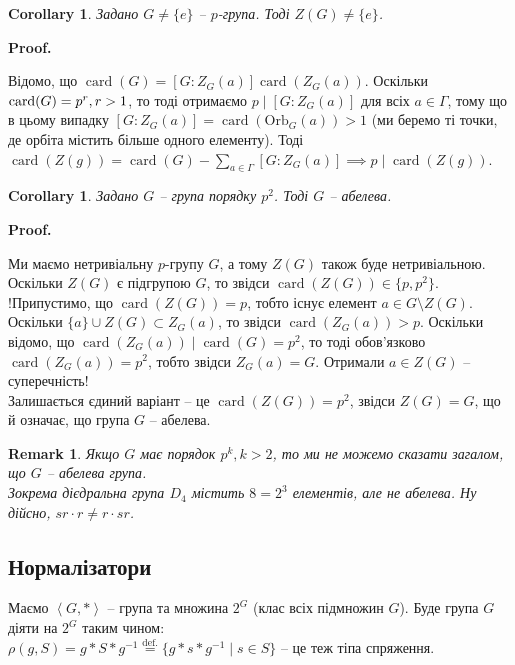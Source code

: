 \documentclass[a4paper, 10pt]{article}
\makeatletter
\theoremstyle{theoremdd}
\theoremstyle{theoremdd}
\theoremstyle{theoremdd}
\theoremstyle{theoremdd}
\theoremstyle{theoremdd}
\theoremstyle{theoremdd}
\theoremstyle{theoremdd}
\theoremstyle{theoremdd}
\theoremstyle{theoremdd}
\theoremstyle{theoremdd}
\theoremstyle{theoremdd}
\newtheorem{remark}[theorem]{Remark}
\theoremstyle{theoremdd}
\theoremstyle{theoremdd}
\theoremstyle{theoremdd}
\newtheorem{corollary}[theorem]{Corollary}
\theoremstyle{theoremdd}
\renewenvironment{proof}[1][Proof.\\]{\par
\pushQED{\hfill \qed}%
\normalfont \topsep6\p@\@plus6\p@\relax
\trivlist
\item\relax
{\bfseries
#1\@addpunct{.}}\hspace\labelsep\ignorespaces
}{%
\popQED\endtrivlist\@endpefalse
}
\DeclareMathOperator{\card}{card}
\newcommand{\eqbydef}{\overset{\text{def.}}{=}}
\newcommand\Orb{\text{Orb}}
\makeatother
\begin{document}
\begin{corollary}
Задано $G \neq \{e\}$ -- $p$-група. Тоді $Z(G) \neq \{e\}$.
\end{corollary}

\begin{proof}
Відомо, що $\card(G) = [G \!: \! Z_G(a)] \card(Z_G(a))$. Оскільки $\card(G) = p^r, \\ r > 1$, то тоді отримаємо $p \mid [G \!: \! Z_G(a)]$ для всіх $a \in \Gamma$, тому що в цьому випадку $[G:Z_G(a)] = \card(\Orb_G(a)) > 1$ (ми беремо ті точки, де орбіта містить більше одного елементу). Тоді\\
$\card(Z(g)) = \card(G) - \displaystyle\sum_{a \in \Gamma}[G: Z_G(a)] \implies p \mid \card(Z(g))$.
\end{proof}

\begin{corollary}
Задано $G$ -- група порядку $p^2$. Тоді $G$ -- абелева.
\end{corollary}

\begin{proof}
Ми маємо нетривіальну $p$-групу $G$, а тому $Z(G)$ також буде нетривіальною. Оскільки $Z(G)$ є підгрупою $G$, то звідси $\card(Z(G)) \in \{p,p^2\}$.\\
!Припустимо, що $\card(Z(G)) = p$, тобто існує елемент $a \in G \setminus Z(G)$. Оскільки $\{a\} \cup Z(G) \subset Z_G(a)$, то звідси $\card(Z_G(a)) > p$. Оскільки відомо, що $\card(Z_G(a)) \mid \card(G) = p^2$, то тоді обов'язково $\card(Z_G(a)) = p^2$, тобто звідси $Z_G(a) = G$. Отримали $a \in Z(G)$ -- суперечність!\\
Залишається єдиний варіант -- це $\card(Z(G)) = p^2$, звідси $Z(G) = G$, що й означає, що група $G$ -- абелева.
\end{proof}

\begin{remark}
Якщо $G$ має порядок $p^k, k > 2$, то ми не можемо сказати загалом, що $G$ -- абелева група.\\
Зокрема дієдральна група $D_4$ містить $8 = 2^3$ елементів, але не абелева. Ну дійсно, $sr \cdot r \neq r \cdot sr$.
\end{remark}

\subsection{Нормалізатори}
Маємо $\left<G,*\right>$ -- група та множина $2^G$ (клас всіх підмножин $G$). Буде група $G$ діяти на $2^G$ таким чином:\\
$\rho(g,S) = g*S*g^{-1} \eqbydef \{g*s*g^{-1} \mid s \in S\}$ -- це теж тіпа спряження.
\end{document}
